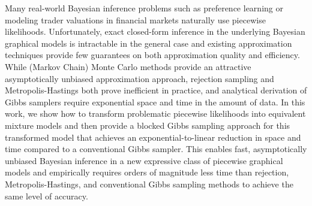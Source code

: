 Many real-world Bayesian inference problems such as preference
learning or modeling trader valuations in financial markets naturally
use piecewise likelihoods.  Unfortunately, exact closed-form inference
in the underlying Bayesian graphical models is intractable in the
general case and existing approximation techniques provide few
guarantees on both approximation quality and efficiency.  While
(Markov Chain) Monte Carlo methods provide an attractive
asymptotically unbiased approximation approach, rejection sampling and
Metropolis-Hastings both prove inefficient in practice, and analytical
derivation of Gibbs samplers require exponential space and time in the
amount of data.  In this work, we show how to transform problematic
piecewise likelihoods into equivalent mixture models and then provide
a blocked Gibbs sampling approach for this transformed model that
achieves an exponential-to-linear reduction in space and time compared
to a conventional Gibbs sampler.  This enables fast, asymptotically
unbiased Bayesian inference in a new expressive class of piecewise graphical
models and empirically requires orders of magnitude less time than
rejection, Metropolis-Hastings, and conventional Gibbs sampling
methods to achieve the same level of accuracy.

